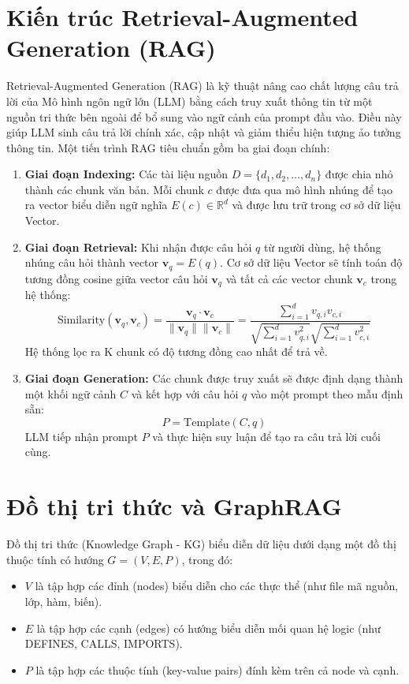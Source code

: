 \documentclass[12pt,a4paper,oneside]{report}
\begin{document}
\section{Kiến trúc Retrieval-Augmented Generation (RAG)}
Retrieval-Augmented Generation (RAG) là kỹ thuật nâng cao chất lượng câu trả lời của Mô hình ngôn ngữ lớn (LLM) bằng cách truy xuất thông tin từ một nguồn tri thức bên ngoài để bổ sung vào ngữ cảnh của prompt đầu vào. Điều này giúp LLM sinh câu trả lời chính xác, cập nhật và giảm thiểu hiện tượng ảo tưởng thông tin. Một tiến trình RAG tiêu chuẩn gồm ba giai đoạn chính:
\begin{enumerate}
    \item \textbf{Giai đoạn Indexing:} Các tài liệu nguồn $D = \{d_1, d_2, \dots, d_n\}$ được chia nhỏ thành các chunk văn bản. Mỗi chunk $c$ được đưa qua mô hình nhúng để tạo ra vector biểu diễn ngữ nghĩa $E(c) \in \mathbb{R}^d$ và được lưu trữ trong cơ sở dữ liệu Vector.
    \item \textbf{Giai đoạn Retrieval:} Khi nhận được câu hỏi $q$ từ người dùng, hệ thống nhúng câu hỏi thành vector $\mathbf{v}_q = E(q)$. Cơ sở dữ liệu Vector sẽ tính toán độ tương đồng cosine giữa vector câu hỏi $\mathbf{v}_q$ và tất cả các vector chunk $\mathbf{v}_c$ trong hệ thống:
    \begin{equation}
        \text{Similarity}(\mathbf{v}_q, \mathbf{v}_c) = \frac{\mathbf{v}_q \cdot \mathbf{v}_c}{\|\mathbf{v}_q\| \|\mathbf{v}_c\|} = \frac{\sum_{i=1}^d v_{q,i} v_{c,i}}{\sqrt{\sum_{i=1}^d v_{q,i}^2} \sqrt{\sum_{i=1}^d v_{c,i}^2}}
    \end{equation}
    Hệ thống lọc ra K chunk có độ tương đồng cao nhất để trả về.
    \item \textbf{Giai đoạn Generation:} Các chunk được truy xuất sẽ được định dạng thành một khối ngữ cảnh $C$ và kết hợp với câu hỏi $q$ vào một prompt theo mẫu định sẵn:
    \begin{equation}
        P = \text{Template}(C, q)
    \end{equation}
    LLM tiếp nhận prompt $P$ và thực hiện suy luận để tạo ra câu trả lời cuối cùng.
\end{enumerate}

\section{Đồ thị tri thức và GraphRAG}
Đồ thị tri thức (Knowledge Graph - KG) biểu diễn dữ liệu dưới dạng một đồ thị thuộc tính có hướng $G = (V, E, P)$, trong đó:
\begin{itemize}
    \item $V$ là tập hợp các đỉnh (nodes) biểu diễn cho các thực thể (như file mã nguồn, lớp, hàm, biến).
    \item $E$ là tập hợp các cạnh (edges) có hướng biểu diễn mối quan hệ logic (như DEFINES, CALLS, IMPORTS).
    \item $P$ là tập hợp các thuộc tính (key-value pairs) đính kèm trên cả node và cạnh.
\end{itemize}
\end{document}
